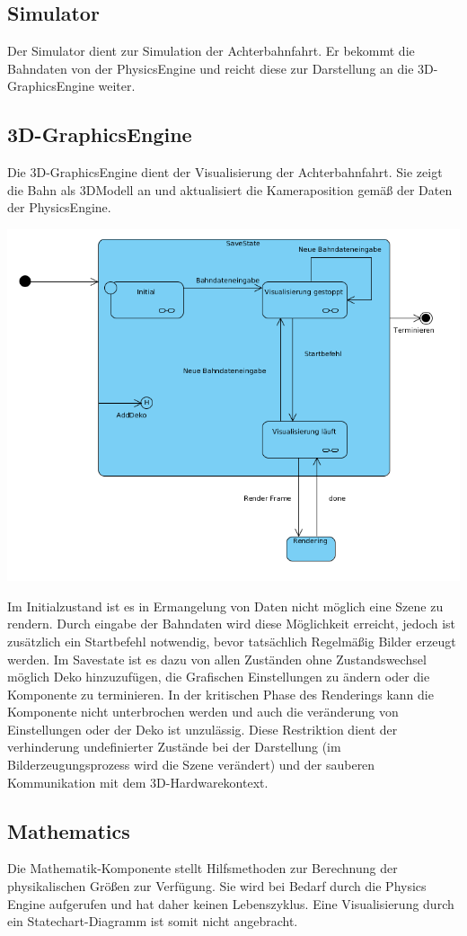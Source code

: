 \subsection{Simulator}
Der Simulator dient zur Simulation der Achterbahnfahrt. Er bekommt die Bahndaten von der PhysicsEngine und reicht diese zur Darstellung an die 3D-GraphicsEngine weiter.
\subsection{3D-GraphicsEngine}
Die 3D-GraphicsEngine dient der Visualisierung der Achterbahnfahrt. Sie zeigt die Bahn als 3DModell an und aktualisiert die Kameraposition gemäß der Daten der PhysicsEngine. 


\includegraphics[width=\linewidth]{bilder/statechart_3dgraphics}

Im Initialzustand ist es in Ermangelung von Daten nicht möglich eine Szene zu rendern. Durch eingabe der Bahndaten wird diese Möglichkeit erreicht, jedoch ist zusätzlich ein Startbefehl notwendig,
bevor tatsächlich Regelmäßig Bilder erzeugt werden. Im Savestate ist es dazu von allen Zuständen ohne Zustandswechsel möglich Deko hinzuzufügen, die Grafischen Einstellungen zu ändern oder die Komponente zu terminieren.
In der kritischen Phase des Renderings kann die Komponente nicht unterbrochen werden und auch die veränderung von Einstellungen oder der Deko ist unzulässig. Diese Restriktion dient der verhinderung undefinierter
Zustände bei der Darstellung (im Bilderzeugungsprozess wird die Szene verändert)  und der sauberen Kommunikation mit dem 3D-Hardwarekontext.

\subsection{Mathematics}
Die Mathematik-Komponente stellt Hilfsmethoden zur Berechnung der physikalischen Größen zur Verfügung. Sie wird bei Bedarf durch die Physics Engine aufgerufen und hat daher keinen Lebenszyklus. Eine Visualisierung durch ein Statechart-Diagramm ist somit nicht angebracht.